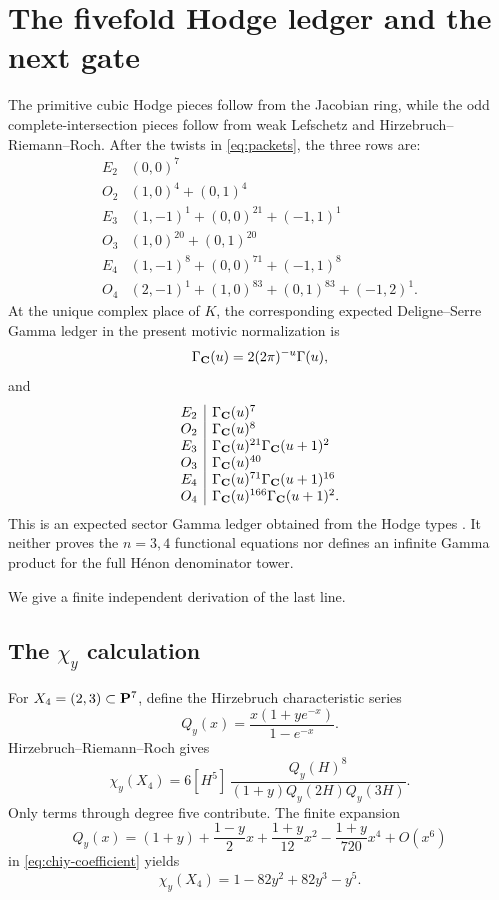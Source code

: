 \section{The fivefold Hodge ledger and the next gate}\label{sec:hodge}

The primitive cubic Hodge pieces follow from the Jacobian ring, while the
odd complete-intersection pieces follow from weak Lefschetz and
Hirzebruch--Riemann--Roch.  After the twists in \eqref{eq:packets}, the
three rows are:
\[
\begin{array}{c|l}
E_2&(0,0)^7\\
O_2&(1,0)^4+(0,1)^4\\
E_3&(1,-1)^1+(0,0)^{21}+(-1,1)^1\\
O_3&(1,0)^{20}+(0,1)^{20}\\
E_4&(1,-1)^8+(0,0)^{71}+(-1,1)^8\\
O_4&(2,-1)^1+(1,0)^{83}+(0,1)^{83}+(-1,2)^1.
\end{array}
\]
At the unique complex place of \(K\), the corresponding expected
Deligne--Serre Gamma ledger in the present motivic normalization is
\[
 \Gamma_{\mathbf C}(u)=2(2\pi)^{-u}\Gamma(u),
\]
and
\[
\begin{array}{c|l}
E_2&\Gamma_{\mathbf C}(u)^7\\
O_2&\Gamma_{\mathbf C}(u)^8\\
E_3&\Gamma_{\mathbf C}(u)^{21}\Gamma_{\mathbf C}(u+1)^2\\
O_3&\Gamma_{\mathbf C}(u)^{40}\\
E_4&\Gamma_{\mathbf C}(u)^{71}\Gamma_{\mathbf C}(u+1)^{16}\\
O_4&\Gamma_{\mathbf C}(u)^{166}\Gamma_{\mathbf C}(u+1)^2.
\end{array}
\]
This is an expected sector Gamma ledger obtained from the Hodge types
\cite{Serre1970,Deligne1979}.  It neither proves the \(n=3,4\)
functional equations nor defines an infinite Gamma product for the full
H\'enon denominator tower.

We give a finite independent derivation of the last line.

\subsection[The chi-y calculation]{The \(\chi_y\) calculation}

For \(X_4=(2,3)\subset\mathbf P^7\), define the Hirzebruch characteristic
series
\[
 Q_y(x)=\frac{x(1+ye^{-x})}{1-e^{-x}}.
\]
Hirzebruch--Riemann--Roch \cite{Hirzebruch1995} gives
\begin{equation}\label{eq:chiy-coefficient}
 \chi_y(X_4)=6[H^5]\,
 \frac{Q_y(H)^8}{(1+y)Q_y(2H)Q_y(3H)}.
\end{equation}
Only terms through degree five contribute.  The finite expansion
\[
 Q_y(x)=(1+y)+\frac{1-y}{2}x+\frac{1+y}{12}x^2
 -\frac{1+y}{720}x^4+O(x^6)
\]
in \eqref{eq:chiy-coefficient} yields
\begin{equation}\label{eq:chiy-value}
 \chi_y(X_4)=1-82y^2+82y^3-y^5.
\end{equation}

